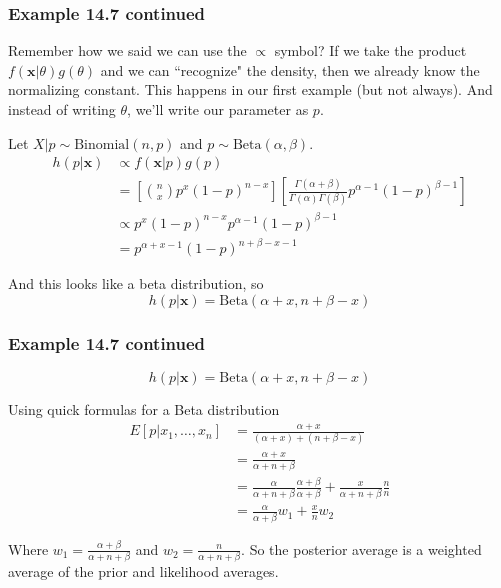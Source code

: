 \documentclass{beamer}
\begin{document}
\begin{frame}
\frametitle{Example 14.7 continued}

Remember how we said we can use the $\propto$ symbol? If we take the product $f(\mathbf{x}|\theta) g(\theta)$ and we can ``recognize" the density, then we already know the normalizing constant. This happens in our first example (but not always). And instead of writing $\theta$, we'll write our parameter as $p$.
\newline

Let $X|p \sim \text{Binomial}(n,p)$ and $p \sim \text{Beta}(\alpha, \beta)$.
\begin{align*}
h(p|\mathbf{x}) &\propto f(\mathbf{x}|p) g(p)\\
&= \left[ {n \choose x} p^x(1-p)^{n-x}\right] \left[ \frac{\Gamma(\alpha + \beta)}{\Gamma(\alpha) \Gamma(\beta)} p^{\alpha-1}(1-p)^{\beta-1} \right] \\
&\propto p^x(1-p)^{n-x} p^{\alpha-1}(1-p)^{\beta-1} \\
&= p^{\alpha + x - 1}(1-p)^{n + \beta - x - 1}
\end{align*}

And this looks like a beta distribution, so
\[
h(p|\mathbf{x}) = \text{Beta}(\alpha + x, n + \beta - x)
\]

\end{frame}

\begin{frame}
\frametitle{Example 14.7 continued}

\[
h(p|\mathbf{x}) = \text{Beta}(\alpha + x, n + \beta - x)
\]

Using quick formulas for a Beta distribution
\begin{align*}
E[p | x_1, \ldots, x_n] &= \frac{\alpha + x}{(\alpha + x ) + (n + \beta - x)} \\
&= \frac{\alpha + x}{\alpha + n + \beta} \\
&= \frac{\alpha}{\alpha + n + \beta}\frac{\alpha + \beta }{\alpha + \beta} + \frac{x}{\alpha + n + \beta}\frac{n}{n} \\
&= \frac{\alpha}{\alpha + \beta} w_1 + \frac{x}{n} w_2
\end{align*}


Where $w_1 = \frac{\alpha + \beta}{\alpha + n + \beta}$ and $w_2 = \frac{n}{\alpha + n + \beta}$. So the posterior average is a weighted average of the prior and likelihood averages.

\end{frame}
\end{document}
